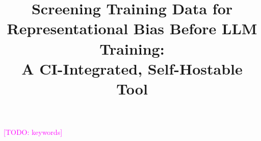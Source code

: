 \documentclass[conference]{IEEEtran}
\DeclareRobustCommand{\todo}[1]{\textcolor{magenta}{[TODO: #1]}}   %
\begin{document}
\title{Screening Training Data for Representational Bias Before LLM Training:\\[0.2em]
{\Large A CI-Integrated, Self-Hostable Tool}}

\author{
}

\maketitle

\begin{abstract}

\end{abstract}

\begin{IEEEkeywords}
\todo{keywords}
\end{IEEEkeywords}









\printbibliography[title={References}]
\end{document}

